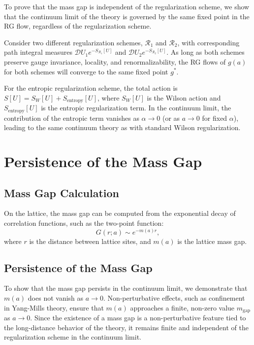To prove that the mass gap is independent of the regularization scheme, we show that the continuum limit of the theory is governed by the same fixed point in the RG flow, regardless of the regularization scheme.

Consider two different regularization schemes, \(\mathcal{R}_1\) and \(\mathcal{R}_2\), with corresponding path integral measures \(\mathcal{D}U_1 e^{-S_{\mathcal{R}_1}[U]}\) and \(\mathcal{D}U_2 e^{-S_{\mathcal{R}_2}[U]}\). As long as both schemes preserve gauge invariance, locality, and renormalizability, the RG flows of \(g(a)\) for both schemes will converge to the same fixed point \(g^*\).

For the entropic regularization scheme, the total action is \(S[U] = S_W[U] + S_{\text{entropy}}[U]\), where \(S_W[U]\) is the Wilson action and \(S_{\text{entropy}}[U]\) is the entropic regularization term. In the continuum limit, the contribution of the entropic term vanishes as \(\alpha \to 0\) (or as \(a \to 0\) for fixed \(\alpha\)), leading to the same continuum theory as with standard Wilson regularization.



\section{Persistence of the Mass Gap}

\subsection{Mass Gap Calculation}

On the lattice, the mass gap can be computed from the exponential decay of correlation functions, such as the two-point function:
\begin{equation}
G(r; a) \sim e^{-m(a)r},
\end{equation}
where \(r\) is the distance between lattice sites, and \(m(a)\) is the lattice mass gap.

\subsection{Persistence of the Mass Gap}

To show that the mass gap persists in the continuum limit, we demonstrate that \(m(a)\) does not vanish as \(a \to 0\). Non-perturbative effects, such as confinement in Yang-Mills theory, ensure that \(m(a)\) approaches a finite, non-zero value \(m_{\text{gap}}\) as \(a \to 0\). Since the existence of a mass gap is a non-perturbative feature tied to the long-distance behavior of the theory, it remains finite and independent of the regularization scheme in the continuum limit.

